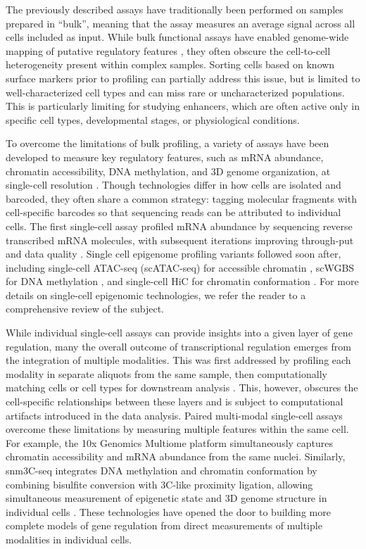 \begin{dissertationintroduction}
The previously described assays have traditionally been performed on samples prepared in “bulk”, meaning that the assay measures an average signal across all cells included as input. While bulk functional assays have enabled genome-wide mapping of putative regulatory features \cite{ENCODE_Project_Consortium2020-ns}, they often obscure the cell-to-cell heterogeneity present within complex samples. Sorting cells based on known surface markers prior to profiling can partially address this issue, but is limited to well-characterized cell types and can miss rare or uncharacterized populations. This is particularly limiting for studying enhancers, which are often active only in specific cell types, developmental stages, or physiological conditions. 

To overcome the limitations of bulk profiling, a variety of  assays have been developed to measure key regulatory features, such as mRNA abundance, chromatin accessibility, DNA methylation, and 3D genome organization, at single-cell resolution \cite{Preissl2022-mq}. Though technologies differ in how cells are isolated and barcoded, they often share a common strategy: tagging molecular fragments with cell-specific barcodes so that sequencing reads can be attributed to individual cells. The first single-cell assay profiled mRNA abundance by sequencing reverse transcribed mRNA molecules, with subsequent iterations improving through-put and data quality \cite{Lafzi2018-jm}. Single cell epigenome profiling variants followed soon after, including single-cell ATAC-seq (scATAC-seq) for accessible chromatin \cite{Buenrostro2015-ox}, scWGBS for DNA methylation \cite{Farlik2015-hr}, and single-cell HiC for chromatin conformation \cite{Nagano2013-tq}. For more details on single-cell epigenomic technologies, we refer the reader to a comprehensive review \cite{Preissl2022-mq} of the subject.

While individual single-cell assays can provide insights into a given layer of gene regulation, many the overall outcome of transcriptional regulation emerges from the integration of multiple modalities. This was first addressed by profiling each modality in separate aliquots from the same sample, then computationally matching cells or cell types for downstream analysis \cite{Argelaguet2021-ws}. This, however, obscures the cell-specific relationships between these layers and is subject to computational artifacts introduced in the data analysis. Paired multi-modal single-cell assays overcome these limitations by measuring multiple features within the same cell. For example, the 10x Genomics Multiome platform simultaneously captures chromatin accessibility and mRNA abundance from the same nuclei. Similarly, snm3C-seq integrates DNA methylation and chromatin conformation by combining bisulfite conversion with 3C-like proximity ligation, allowing simultaneous measurement of epigenetic state and 3D genome structure in individual cells \cite{Liu2021-km,Lee2019-qo}. These technologies have opened the door to building more complete models of gene regulation from direct measurements of multiple modalities in individual cells.


\end{dissertationintroduction}
